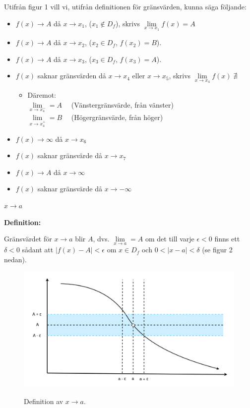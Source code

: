 \documentclass[swedish]{article}
\begin{document}
Utifrån figur 1 vill vi, utifrån definitionen för gränsvärden, kunna säga följande:

\begin{itemize}
    \item{$f(x) \to A$ då $x \to x_1$, ($x_1 \notin D_f$), skrivs $\lim\limits_{x \to x_1} f(x) = A$}
    \item{$f(x) \to A$ då $x \to x_2$, ($x_2 \in D_f$, $f(x_2) = B$).}
    \item{$f(x) \to A$ då $x \to x_3$, ($x_3 \in D_f$, $f(x_3) = A$).}
    \item{$f(x)$ saknar gränsvärden då $x \to x_4$ eller $x \to x_5$, skrivs $\lim\limits_{x \to x_4} f(x) \; \nexists$}
        \begin{itemize}
            \item{Däremot:\\

                $\lim\limits_{x \to x_4^-} = A \quad$ (Vänstergränsvärde, från vänster)\\

                $\lim\limits_{x \to x_4^+} = B \quad$ (Högergränsvärde, från höger)}
        \end{itemize}
    \item{$f(x) \to \infty$ då $x \to x_6$}
    \item{$f(x)$ saknar gränsvärde då $x \to x_7$}
    \item{$f(x) \to A$ då $x \to \infty$}
    \item{$f(x)$ saknar gränsvärde då $x \to -\infty$}
\end{itemize}

\bigbreak

{\Large\underline{$x \to a$}}

\smallbreak

\textbf{Definition:}

\smallskip

Gränsvärdet för $x \to a$ blir $A$, dvs. $\lim\limits_{x \to a} = A$ om det till varje $\epsilon < 0$ finns ett $\delta < 0$ sådant att $|f(x) - A| < \epsilon$ om $x \in D_f$ och $0 < |x - a| < \delta$ (se figur 2 nedan). 

\begin{figure}[h!]
    \includegraphics[width=\linewidth]{figur2.png}
    \label{fig:figure2}
    \caption{Definition av $x \to a$.}
\end{figure}
\end{document}
